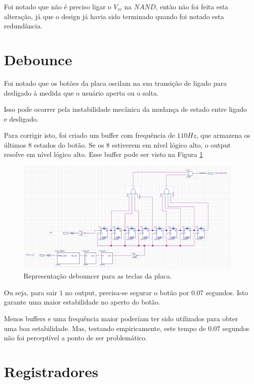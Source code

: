 Foi notado que não é preciso ligar o $V_{cc}$ na $NAND$, então não foi feita esta alteração, já que o design já havia sido terminado quando foi notado esta redundância.

\section{Debounce}

Foi notado que os botões da placa oscilam na sua transição de ligado para desligado à medida que o usuário aperta ou o solta.

Isso pode ocorrer pela instabilidade mecânica da mudança de estado entre ligado e desligado.

Para corrigir isto, foi criado um buffer com frequência de $110Hz$, que armazena os últimos 8 estados do botão. Se os 8 estiverem em nível lógico alto, o output resolve em nível lógico alto. Esse buffer pode ser visto na Figura \ref{fig:2.14}

\begin{figure}[H]
	\centering
	\includegraphics[width=1\columnwidth]{FIGURAS/cap_2/debounce.png}
	\caption{Representação debouncer para as teclas da placa.}
        \label{fig:2.14}
\end{figure}



Ou seja, para sair $1$ no output, precisa-se segurar o botão por $0.07$ segundos. Isto garante uma maior estabilidade no aperto do botão.

Menos buffers e uma frequência maior poderíam ter sido utilizados para obter uma boa estabilidade. Mas, testando empiricamente, este tempo de $0.07$ segundos não foi perceptível a ponto de ser problemático.





\section{Registradores}

